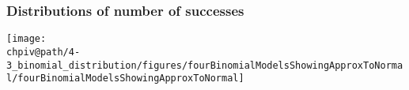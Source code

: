 \documentclass[slidestop,compress,mathserif]{beamer}
\makeatletter
\def\chpiv@path{../../Chp 4}
\makeatother
\begin{document}







\begin{frame}
\frametitle{Distributions of number of successes}


\begin{center}
\texttt{[image: \\chpiv@path/4-3\_binomial\_distribution/figures/fourBinomialModelsShowingApproxToNormal/fourBinomialModelsShowingApproxToNormal]}
\end{center}

\end{frame}
\end{document}
